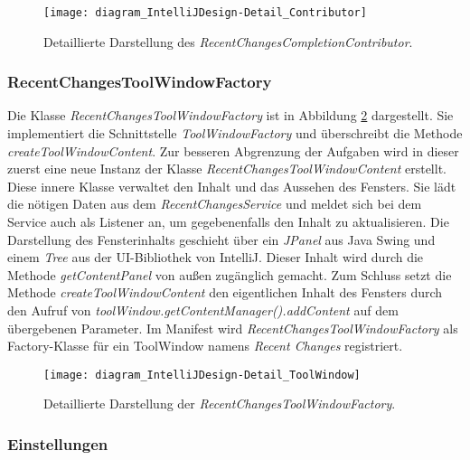 \begin{figure}
    \centering
    \texttt{[image: diagram\_IntelliJDesign-Detail\_Contributor]}
    \caption{Detaillierte Darstellung des \emph{RecentChangesCompletionContributor}.}
    \label{fig:diagram_IntelliJDesign-Detail_Contributor}
\end{figure}

\subsubsection{RecentChangesToolWindowFactory}

Die Klasse \emph{RecentChangesToolWindowFactory} ist in Abbildung
\ref{fig:diagram_IntelliJDesign-Detail_ToolWindow} dargestellt.
Sie implementiert die Schnittstelle \emph{ToolWindowFactory} 
und überschreibt die Methode \emph{createToolWindowContent}. Zur besseren 
Abgrenzung der Aufgaben wird in dieser zuerst eine neue Instanz
der Klasse \emph{RecentChangesToolWindowContent} erstellt.
Diese innere Klasse verwaltet den Inhalt und das Aussehen des Fensters.
Sie lädt die nötigen Daten aus dem \emph{RecentChangesService} und
meldet sich bei dem Service auch als Listener an, um gegebenenfalls den
Inhalt zu aktualisieren. Die Darstellung des Fensterinhalts
geschieht über ein \emph{JPanel} aus Java Swing und einem \emph{Tree}
aus der UI-Bibliothek von IntelliJ. Dieser Inhalt wird
durch die Methode \emph{getContentPanel} von außen zugänglich gemacht.
Zum Schluss setzt die Methode \emph{createToolWindowContent} 
den eigentlichen Inhalt des Fensters durch den Aufruf von
\emph{toolWindow.getContentManager().addContent} auf dem übergebenen
Parameter.
Im Manifest wird \emph{RecentChangesToolWindowFactory} als Factory-Klasse
für ein ToolWindow namens \emph{Recent Changes} registriert.

\begin{figure}
    \centering
    \texttt{[image: diagram\_IntelliJDesign-Detail\_ToolWindow]}
    \caption{Detaillierte Darstellung der \emph{RecentChangesToolWindowFactory}.}
    \label{fig:diagram_IntelliJDesign-Detail_ToolWindow}
\end{figure}

\subsubsection{Einstellungen}

